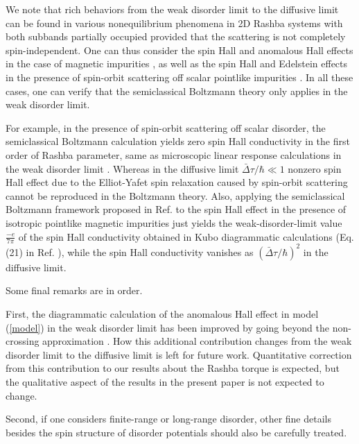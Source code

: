 \documentclass
[aps,pra,amsfonts,amssymb,twocolumn,amsmath,preprintnumbers,nofootinbib,floatfix,
showpacs,superscriptaddress]{revtex4-1}%
\begin{document}
We note that rich behaviors from the weak disorder limit to the diffusive
limit can be found in various nonequilibrium phenomena in 2D Rashba systems
with both subbands partially occupied provided that the scattering is not
completely spin-independent. One can thus consider the spin Hall and anomalous
Hall effects in the case of magnetic impurities \cite{Wang2007,Ren2008}, as
well as the spin Hall and Edelstein effects in the presence of spin-orbit
scattering off scalar pointlike impurities \cite{Culcer2013,Raimondi2012}. In
all these cases, one can verify that the semiclassical Boltzmann theory only
applies in the weak disorder limit.

For example, in the presence of spin-orbit scattering off scalar disorder, the
semiclassical Boltzmann calculation \cite{note-SO scattering} yields zero spin
Hall conductivity in the first order of Rashba parameter, same as microscopic
linear response calculations in the weak disorder limit \cite{Culcer2013}.
Whereas in the diffusive limit $\bar{\Delta}\tau/\hbar\ll1$ nonzero spin Hall
effect due to the Elliot-Yafet spin relaxation caused by spin-orbit scattering
\cite{Raimondi2012} cannot be reproduced in the Boltzmann theory. Also,
applying the semiclassical Boltzmann framework proposed in Ref.
 to the spin Hall effect in the presence of isotropic
pointlike magnetic impurities just yields the weak-disorder-limit value
$\frac{-e}{7\pi}$ of the spin Hall conductivity obtained in Kubo diagrammatic
calculations (Eq. (21) in Ref. ), while the spin Hall
conductivity vanishes as $\left(  \bar{\Delta}\tau/\hbar\right)  ^{2}$ in the
diffusive limit.

Some final remarks are in order.

First, the diagrammatic calculation of the anomalous Hall effect in model
(\ref{model}) in the weak disorder limit has been improved by going beyond the
non-crossing approximation \cite{Ado}. How this additional contribution
changes from the weak disorder limit to the diffusive limit is left for future
work. Quantitative correction from this contribution to our results about the
Rashba torque is expected, but the qualitative aspect of the results in the
present paper is not expected to change.

Second, if one considers finite-range or long-range disorder, other fine
details besides the spin structure of disorder potentials should also be
carefully treated.
\end{document}
